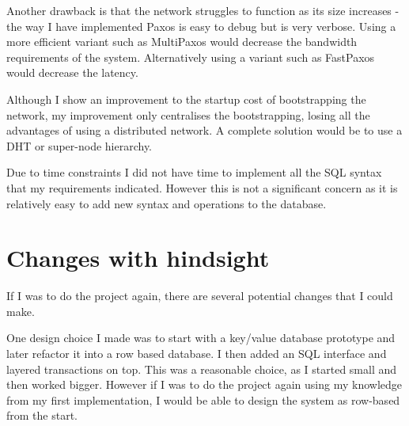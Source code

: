 \documentclass[12pt,twoside,notitlepage]{report}
\begin{document}
Another drawback is that the network struggles to function as its size increases - the way I have
implemented Paxos is easy to debug but is very verbose. Using a more efficient variant such as
MultiPaxos would decrease the bandwidth requirements of the system. Alternatively using a variant
such as FastPaxos would decrease the latency.

Although I show an improvement to the startup cost of bootstrapping the network, my improvement
only centralises the bootstrapping, losing all the advantages of using a distributed network. A
complete solution would be to use a DHT or super-node hierarchy.

Due to time constraints I did not have time to implement all the SQL syntax that my requirements
indicated. However this is not a significant concern as it is relatively easy to add new syntax and
operations to the database.

\section{Changes with hindsight}

If I was to do the project again, there are several potential changes that I could make.


One design choice I made was to start with a key/value database prototype and later
refactor it into a row based database. I then added an SQL interface and layered transactions on
top. This was a reasonable choice, as I started small and then worked bigger. However if I was to
do the project again using my knowledge from my first implementation, I would be able to
design the system as row-based from the start.

\end{document}
